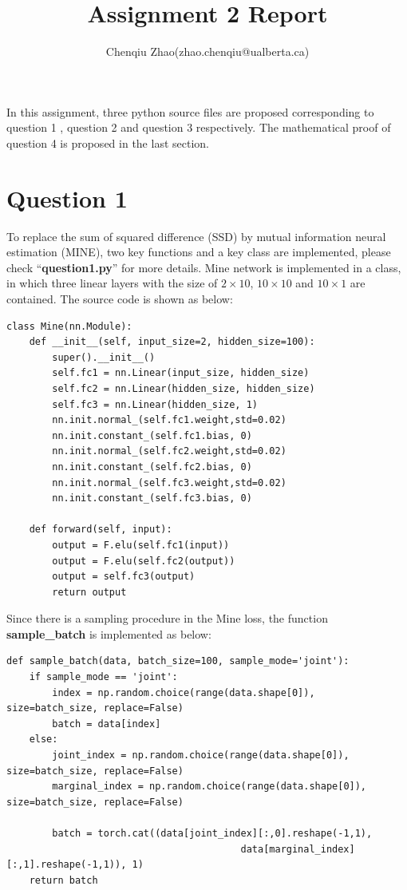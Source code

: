 \documentclass[UTF8]{article}
\title{Assignment 2 Report}
\author{Chenqiu Zhao(zhao.chenqiu@ualberta.ca)}
\date{}
\begin{document}
\maketitle

In this assignment, three python source files are proposed corresponding to question 1 , question 2 and question 3 respectively.
The mathematical proof of question 4 is proposed in the last section.


\section*{Question 1}
\label{sec_q}
To replace the sum of squared difference (SSD) by mutual information neural estimation (MINE), two key functions and a key class are implemented,
please check ``\textbf{question1.py}'' for more details.
Mine network is implemented in a class, in which three linear layers with the size of $2 \times 10$, $10 \times 10$ and $10 \times 1$ are contained.
The source code is shown as below:
\begin{lstlisting}
class Mine(nn.Module):
    def __init__(self, input_size=2, hidden_size=100):
        super().__init__()
        self.fc1 = nn.Linear(input_size, hidden_size)
        self.fc2 = nn.Linear(hidden_size, hidden_size)
        self.fc3 = nn.Linear(hidden_size, 1)
        nn.init.normal_(self.fc1.weight,std=0.02)
        nn.init.constant_(self.fc1.bias, 0)
        nn.init.normal_(self.fc2.weight,std=0.02)
        nn.init.constant_(self.fc2.bias, 0)
        nn.init.normal_(self.fc3.weight,std=0.02)
        nn.init.constant_(self.fc3.bias, 0)

    def forward(self, input):
        output = F.elu(self.fc1(input))
        output = F.elu(self.fc2(output))
        output = self.fc3(output)
        return output
\end{lstlisting}

Since there is a sampling procedure in the Mine loss, the function \textbf{sample\_batch} is implemented as below:
\begin{lstlisting}
def sample_batch(data, batch_size=100, sample_mode='joint'):
    if sample_mode == 'joint':
        index = np.random.choice(range(data.shape[0]), size=batch_size, replace=False)
        batch = data[index]
    else:
        joint_index = np.random.choice(range(data.shape[0]), size=batch_size, replace=False)
        marginal_index = np.random.choice(range(data.shape[0]), size=batch_size, replace=False)

        batch = torch.cat((data[joint_index][:,0].reshape(-1,1),
                                         data[marginal_index][:,1].reshape(-1,1)), 1)
    return batch
\end{lstlisting}
\end{document}
